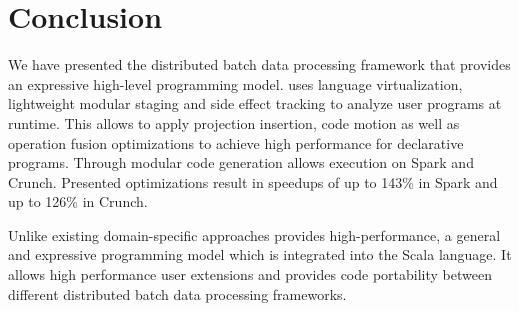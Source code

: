 \section{Conclusion}
\label{sec:conclusion}

We have presented the distributed batch data processing framework \tool that provides an
expressive high-level programming model. \tool uses language virtualization,
lightweight modular staging and side effect tracking to analyze user programs at
runtime. This allows \tool to apply projection insertion, code motion as well as
operation fusion optimizations to achieve high performance for declarative
programs. Through modular code generation \tool allows execution on Spark and
Crunch. Presented optimizations result in speedups of up to 143\% in
Spark and up to 126\% in Crunch.

Unlike existing domain-specific approaches \tool provides high-performance,
a general and expressive programming model which is integrated into the Scala
language. It allows high performance user extensions and provides code
portability between different distributed batch data processing frameworks.

